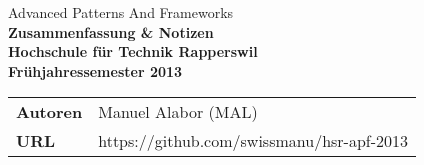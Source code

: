 \begin{titlepage}

	\thispagestyle{empty}
	\BgThispage

	\sffamily\color{titlepagefontcolor}
	\begin{center}
		\Large
		Advanced Patterns And Frameworks\\[5mm]
	   
		\Huge\bfseries
		Zusammenfassung \& Notizen\\[15mm]

		\large\normalfont\sffamily
		Hochschule für Technik Rapperswil\\[1mm]
		Frühjahressemester 2013
	\end{center}
	\vfill

	\begin{multicols}{2}
		\begin{tabularx}{\textwidth}{l X}
			\bfseries Autoren & Manuel Alabor (MAL)\tabularnewline
			\bfseries URL & https://github.com/swissmanu/hsr-apf-2013\tabularnewline
		\end{tabularx}
		
	\end{multicols}

\end{titlepage}

\restoregeometry